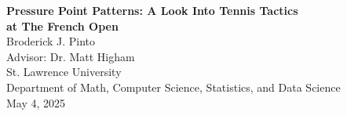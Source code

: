 \begin{titlepage}
\begin{center}
\vspace*{2cm}

{\LARGE \textbf{Pressure Point Patterns: A Look Into Tennis Tactics\\[0.5em]
at The French Open}}\\[3em]

{\Large Broderick J. Pinto}\\[1ex]
Advisor: Dr. Matt Higham\\[1ex]
St. Lawrence University\\
Department of Math, Computer Science, Statistics, and Data Science\\[3ex]
May 4, 2025

\vfill
\end{center}
\end{titlepage}
\clearpage
